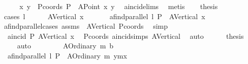 \begin{isabellebody}
%
\endisadelimproof
%
\isatagproof
{}\isamarkupfalse%
\ {\isacharminus}{\kern0pt}\isanewline
\ \ \isamarkupfalse%
\ x{}\ y{}\ \ Pcoords{\isacharcolon}{\kern0pt}\ {\isachardoublequoteopen}P\ {\isacharequal}{\kern0pt}\ {\isacharparenleft}{\kern0pt}A{}Point\ x{}\ y{}{\isacharparenright}{\kern0pt}{\isachardoublequoteclose}\ \isamarkupfalse%
\ a{}incid{\isachardot}{\kern0pt}elims\ \isamarkupfalse%
\ metis\isanewline
\ \ \isamarkupfalse%
\ {\isacharquery}{\kern0pt}thesis\ \isanewline
\ \ \isamarkupfalse%
\ {\isacharparenleft}{\kern0pt}cases\ l{\isacharparenright}{\kern0pt}\isanewline
\ \ \ \ \isamarkupfalse%
\ {\isacharparenleft}{\kern0pt}A{}Vertical\ x{}{\isacharparenright}{\kern0pt}\isanewline
\ \ \ \ \isamarkupfalse%
\ {}{\isacharcolon}{\kern0pt}\ {\isachardoublequoteopen}a{}find{\isacharunderscore}{\kern0pt}parallel\ l\ P\ {\isacharequal}{\kern0pt}\ A{}Vertical\ x{}{\isachardoublequoteclose}\ \isamarkupfalse%
\ a{}find{\isacharunderscore}{\kern0pt}parallel{\isachardot}{\kern0pt}cases\ assms\ \ A{}Vertical\ Pcoords\ \isamarkupfalse%
\ simp\ \isanewline
\ \ \ \ \isamarkupfalse%
\ {}{\isacharcolon}{\kern0pt}\ {\isachardoublequoteopen}a{}incid\ P\ {\isacharparenleft}{\kern0pt}A{}Vertical\ x{}{\isacharparenright}{\kern0pt}{\isachardoublequoteclose}\ \isamarkupfalse%
\ Pcoords\ a{}incid{\isachardot}{\kern0pt}simps\ A{}Vertical\ \isamarkupfalse%
\ auto\isanewline
\ \ \ \ \isamarkupfalse%
\ {\isacharquery}{\kern0pt}thesis\ \isamarkupfalse%
\ {}\ {}\ \isamarkupfalse%
\ auto\isanewline
\ \ \isamarkupfalse%
\isanewline
\ \ \ \ \isamarkupfalse%
\ {\isacharparenleft}{\kern0pt}A{}Ordinary\ m\ b{\isacharparenright}{\kern0pt}\isanewline
\ \ \ \ \isamarkupfalse%
\ {}{\isacharcolon}{\kern0pt}\ {\isachardoublequoteopen}a{}find{\isacharunderscore}{\kern0pt}parallel\ l\ P\ {\isacharequal}{\kern0pt}\ {\isacharparenleft}{\kern0pt}A{}Ordinary\ m\ {\isacharparenleft}{\kern0pt}y{}{\isacharminus}{\kern0pt}m{\isacharasterisk}{\kern0pt}x{}{\isacharparenright}{\kern0pt}{\isacharparenright}{\kern0pt}{\isachardoublequoteclose}\ \isamarkupfalse%

\end{isabellebody}
